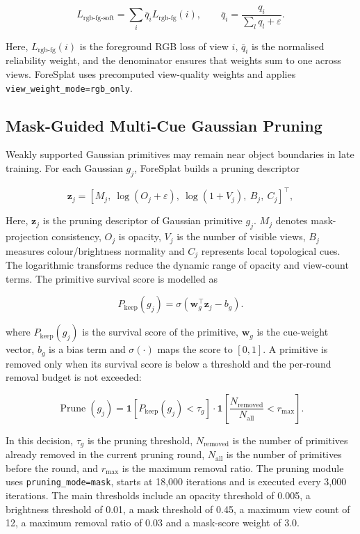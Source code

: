 \documentclass[a4paper]{cas-sc}
\begin{document}
\[
L_{\text{rgb-fg-soft}}=\sum_i \bar{q}_i L_{\text{rgb-fg}}(i),\qquad
\bar{q}_i=\frac{q_i}{\sum_l q_l+\varepsilon}.
\]

Here, \(L_{\text{rgb-fg}}(i)\) is the foreground RGB loss of view \(i\), \(\bar{q}_i\) is the normalised reliability weight, and the denominator ensures that weights sum to one across views. ForeSplat uses precomputed view-quality weights and applies \texttt{view\_weight\_mode=rgb\_only}.

\subsection{Mask-Guided Multi-Cue Gaussian Pruning}\label{sec:mask-guided-multi-cue-gaussian-pruning}

Weakly supported Gaussian primitives may remain near object boundaries in late training. For each Gaussian \(g_j\), ForeSplat builds a pruning descriptor

\[
\mathbf{z}_j=\left[
M_j,\ \log(O_j+\varepsilon),\ \log(1+V_j),\ B_j,\ C_j
\right]^{\top},
\]

Here, \(\mathbf{z}_j\) is the pruning descriptor of Gaussian primitive \(g_j\). \(M_j\) denotes mask-projection consistency, \(O_j\) is opacity, \(V_j\) is the number of visible views, \(B_j\) measures colour/brightness normality and \(C_j\) represents local topological cues. The logarithmic transforms reduce the dynamic range of opacity and view-count terms. The primitive survival score is modelled as

\[
P_{\text{keep}}(g_j)=\sigma\left(\mathbf{w}_{g}^{\top}\mathbf{z}_j-b_g\right).
\]

where \(P_{\text{keep}}(g_j)\) is the survival score of the primitive, \(\mathbf{w}_g\) is the cue-weight vector, \(b_g\) is a bias term and \(\sigma(\cdot)\) maps the score to \([0,1]\). A primitive is removed only when its survival score is below a threshold and the per-round removal budget is not exceeded:

\[
\operatorname{Prune}(g_j)=\mathbf{1}\left[
P_{\text{keep}}(g_j)<\tau_g\right]\cdot
\mathbf{1}\left[\frac{N_{\text{removed}}}{N_{\text{all}}}<r_{\max}\right].
\]

In this decision, \(\tau_g\) is the pruning threshold, \(N_{\text{removed}}\) is the number of primitives already removed in the current pruning round, \(N_{\text{all}}\) is the number of primitives before the round, and \(r_{\max}\) is the maximum removal ratio. The pruning module uses \texttt{pruning\_mode=mask}, starts at 18,000 iterations and is executed every 3,000 iterations. The main thresholds include an opacity threshold of 0.005, a brightness threshold of 0.01, a mask threshold of 0.45, a maximum view count of 12, a maximum removal ratio of 0.03 and a mask-score weight of 3.0.
\end{document}
